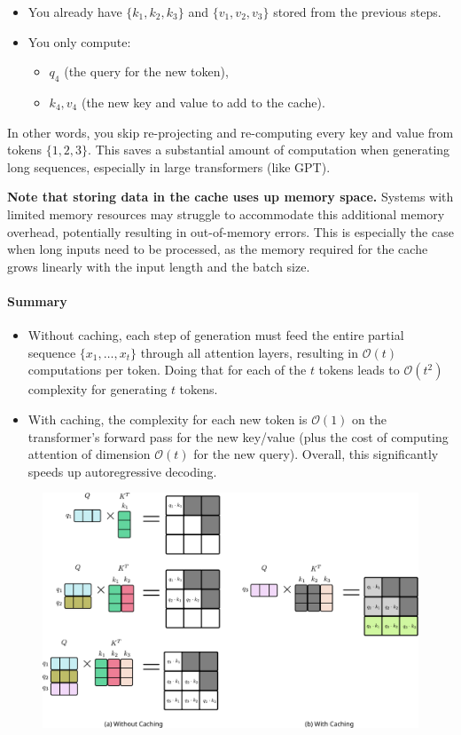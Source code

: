 \begin{itemize}
	\item You already have \(\{k_1, k_2, k_3\}\) and \(\{v_1, v_2, v_3\}\) stored from the previous steps.  
	\item You only compute:
		\begin{itemize}
			\item \(q_4\) (the query for the new token),
			\item \(k_4, v_4\) (the new key and value to add to the cache).  
		\end{itemize}
\end{itemize}
In other words, you skip re-projecting and re-computing every key and value from tokens \(\{1,2,3\}\). This saves a substantial amount of computation when generating long sequences, especially in large transformers (like GPT).

\textbf{Note that storing data in the cache uses up memory space.} Systems with limited memory resources may struggle to accommodate this additional memory overhead, potentially resulting in out-of-memory errors. This is especially the case when long inputs need to be processed, as the memory required for the cache grows linearly with the input length and the batch size.

\paragraph{Summary}
\begin{itemize}
	\item Without caching, each step of generation must feed the entire partial sequence \(\{x_1, \ldots, x_t\}\) through all attention layers, resulting in \(\mathcal{O}(t)\) computations per token. Doing that for each of the \(t\) tokens leads to \(\mathcal{O}(t^2)\) complexity for generating \(t\) tokens.
	\item With caching, the complexity for each new token is \(\mathcal{O}(1)\) on the transformer's forward pass for the new key/value (plus the cost of computing attention of dimension \(\mathcal{O}(t)\) for the new query). Overall, this significantly speeds up autoregressive decoding.
\end{itemize}


\begin{figure}[t]
	\centering
	\includegraphics[scale=0.8]{./images/transformer/kv_caching.pdf}
\end{figure}


